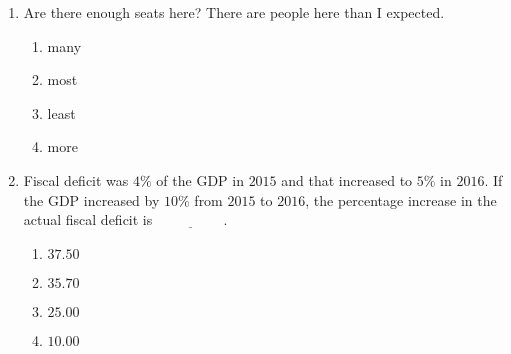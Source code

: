 \documentclass[journal,12pt,onecolumn]{IEEEtran}
\theoremstyle{remark}
\begin{document}
\begin{enumerate}
	\item Are there enough seats here? There are \underline{\hspace{2cm}} people here than I expected.
		\begin{enumerate}                           
                        \item many                          
                        \item most                          
                        \item least
                        \item more
                \end{enumerate}

	\item Fiscal deficit was $4\%$ of the GDP in $2015$ and that increased to $5\%$ in $2016$. If the GDP increased by $10\%$ from $2015$ to $2016$, the percentage increase in the actual fiscal deficit is $\underline{\hspace{2cm}}$.
		\begin{enumerate}                           
                        \item $37.50$                      
                        \item $35.70$               
                        \item $25.00$
                        \item $10.00$
                \end{enumerate}


\end{enumerate}
\end{document}
